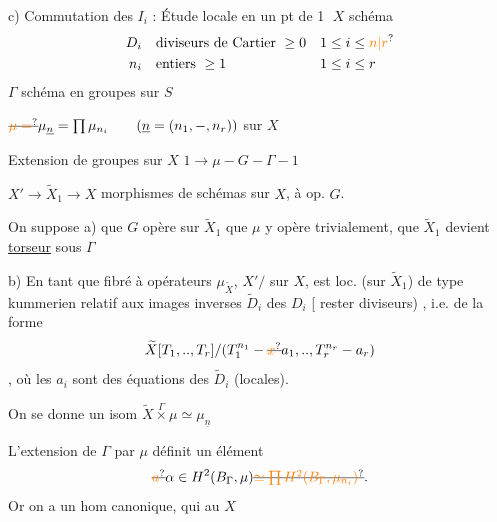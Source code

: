 c) Commutation des $I_i$ :  Étude locale en un pt de
\textcircled{1} $X$ schéma
\[
\begin{aligned}
D_i&\quad\text{diviseurs de Cartier }\geq0 &&1\leq i\leq\unsure{n|r}\\
n_i&\quad\text{entiers }\geq1 &&1\leq i\leq r
\end{aligned}
\]
$\Gamma$ schéma en groupes sur $S$

$\deleted{\unsure{\mu=}}\mu_{\underline n}=\prod\mu_{n_i}\qquad(\underline n=(n_1,-,n_r))$ sur $X$

Extension de groupes sur $X$ \quad $1\to\mu\mathbin{-}G\mathbin{-}\Gamma\mathbin{-}1$

$X'\longrightarrow\widetilde X_1\longrightarrow X$ morphismes de schémas sur $X$, à op. $G$.

On suppose a) que $G$ opère sur $\widetilde X_1$ que $\mu$ y opère
trivialement, que  $\widetilde X_1$ devient \uline{torseur} sous $\Gamma$

b) En tant que fibré à opérateurs $\mu_{\widetilde X}$, $X'/$ sur $X$,
est loc.  (sur $\widetilde X_1$) de type kummerien
relatif aux images inverses $\widetilde D_i$ des $D_i$
[ rester  diviseurs) , i.e. de la forme
\[
\widetilde X[T_1,..,T_r]/(T_1^{n_1}-\deleted{\unsure{x}}a_1,..,T_r^{n_r}-a_r)
\]
, où les $a_i$ sont des équations des $\widetilde D_i$ (locales).

 On se donne un isom $\widetilde X\mathbin{\overset{\Gamma}{\times}}\mu\simeq\mu_{\underline n}$

L'extension  de $\Gamma$ par $\mu$ définit un élément
\[
\deleted{\unsure{a}}\alpha\in H^2(B_\Gamma,\mu)\deleted{\unsure{\simeq\prod H^2(B_\Gamma,\mu_{n_i})}} .
\]
Or on a un hom canonique, qui au  $X$

